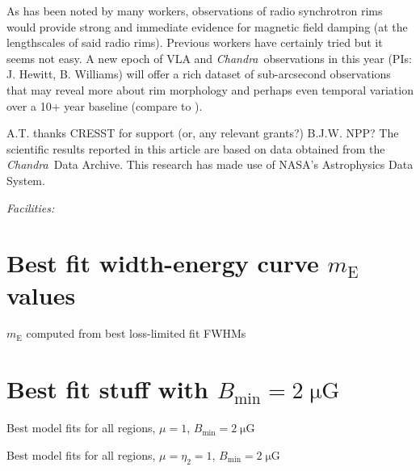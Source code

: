 \documentclass[iop, apj, numberedappendix]{emulateapj}
\newcommand*{\mt}{\mathrm}
\newcommand*{\unit}[1]{\;\mt{#1}}  %
\newcommand*{\Chandra}{\textit{Chandra}\ }
\newcommand*{\mE}{m_\mt{E}}
\newcommand*{\muG}{\unit{\mu G}}
\begin{document}
As has been noted by many workers, observations of radio synchrotron rims would
provide strong and immediate evidence for magnetic field damping (at the
lengthscales of said radio rims).  Previous workers have certainly tried
\citep{cassam-chenai2007, morlino2012} but it seems not easy.
A new epoch of VLA and \Chandra observations in this year (PIs: J. Hewitt, B.
Williams) will offer a rich dataset of sub-arcsecond observations that may
reveal more about rim morphology and perhaps even temporal variation over a 10+
year baseline (compare to \citet{katsuda2010-sn1006}).

\acknowledgments

A.T. thanks CRESST for support (or, any relevant grants?)
B.J.W. NPP?
The scientific results reported in this article are based on data obtained from
the \Chandra Data Archive.
This research has made use of NASA's Astrophysics Data System.

{\it Facilities:} 

\clearpage
\appendix

\setcounter{table}{0}
\renewcommand{\thetable}{A\arabic{table}}
\setcounter{figure}{0}
\renewcommand{\thefigure}{A\arabic{figure}}

\section{Best fit width-energy curve $m_\mt{E}$ values}

\begin{table*}[ht]
    \footnotesize
    \centering
    \caption{$m_\mt{E}$ computed from best loss-limited fit FWHMs}
    
\end{table*}

\clearpage
\section{Best fit stuff with $B_{\mt{min}}=2\muG$}

\begin{table}[ht]
    \scriptsize
    \centering
    \caption{Best model fits for all regions, $\mu = 1$, $B_{\mt{min}}=2\muG$}
    
\end{table}

\begin{table}[ht]
    \scriptsize
    \centering
    \caption{Best model fits for all regions, $\mu = \eta_2 = 1$,
        $B_{\mt{min}}=2\muG$}
    
\end{table}
\end{document}
